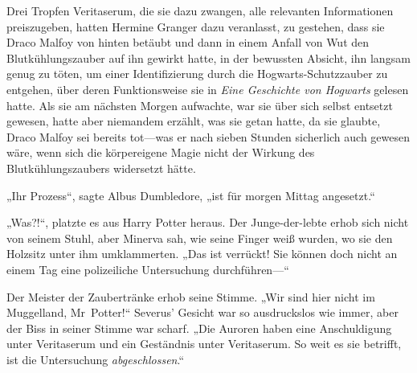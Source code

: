 Drei Tropfen Veritaserum, die sie dazu zwangen, alle relevanten Informationen preiszugeben, hatten Hermine Granger dazu veranlasst, zu gestehen, dass sie Draco Malfoy von hinten betäubt und dann in einem Anfall von Wut den Blutkühlungszauber auf ihn gewirkt hatte, in der bewussten Absicht, ihn langsam genug zu töten, um einer Identifizierung durch die Hogwarts-Schutzzauber zu entgehen, über deren Funktionsweise sie in \emph{Eine Geschichte von Hogwarts} gelesen hatte. Als sie am nächsten Morgen aufwachte, war sie über sich selbst entsetzt gewesen, hatte aber niemandem erzählt, was sie getan hatte, da sie glaubte, Draco Malfoy sei bereits tot—was er nach sieben Stunden sicherlich auch gewesen wäre, wenn sich die körpereigene Magie nicht der Wirkung des Blutkühlungszaubers widersetzt hätte.

„Ihr Prozess“, sagte Albus Dumbledore, „ist für morgen Mittag angesetzt.“

„Was?!“, platzte es aus Harry Potter heraus.
Der Junge-der-lebte erhob sich nicht von seinem Stuhl, aber Minerva sah, wie seine Finger weiß wurden, wo sie den Holzsitz unter ihm umklammerten.
„Das ist verrückt! Sie können doch nicht an einem Tag eine polizeiliche Untersuchung durchführen—“

Der Meister der Zaubertränke erhob seine Stimme.
„Wir sind hier nicht im Muggelland, Mr~Potter!“
Severus' Gesicht war so ausdruckslos wie immer, aber der Biss in seiner Stimme war scharf.
„Die Auroren haben eine Anschuldigung unter Veritaserum und ein Geständnis unter Veritaserum. So weit es sie betrifft, ist die Untersuchung \emph{abgeschlossen}.“

